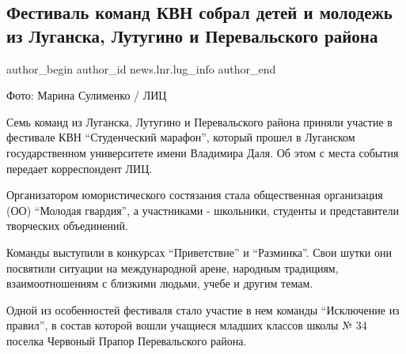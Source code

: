  
 
 
 
 
 
\subsection{Фестиваль команд КВН собрал детей и молодежь из Луганска, Лутугино и Перевальского района}
\label{sec:24_01_2022.stz.news.lnr.lug_info.3.festival_komand_kvn}
 
\ifcmt
 author_begin
   author_id news.lnr.lug_info
 author_end
\fi

Фото: Марина Сулименко / ЛИЦ

Семь команд из Луганска, Лутугино и Перевальского района приняли участие в
фестивале КВН \enquote{Студенческий марафон}, который прошел в Луганском
государственном университете имени Владимира Даля. Об этом с места события
передает корреспондент ЛИЦ.


Организатором юмористического состязания стала общественная организация (ОО)
\enquote{Молодая гвардия}, а участниками - школьники, студенты и представители
творческих объединений.


Команды выступили в конкурсах \enquote{Приветствие} и \enquote{Разминка}. Свои шутки они
посвятили ситуации на международной арене, народным традициям, взаимоотношениям
с близкими людьми, учебе и другим темам.


Одной из особенностей фестиваля стало участие в нем команды \enquote{Исключение из
правил}, в состав которой вошли учащиеся младших классов школы № 34 поселка
Червоный Прапор Перевальского района.

